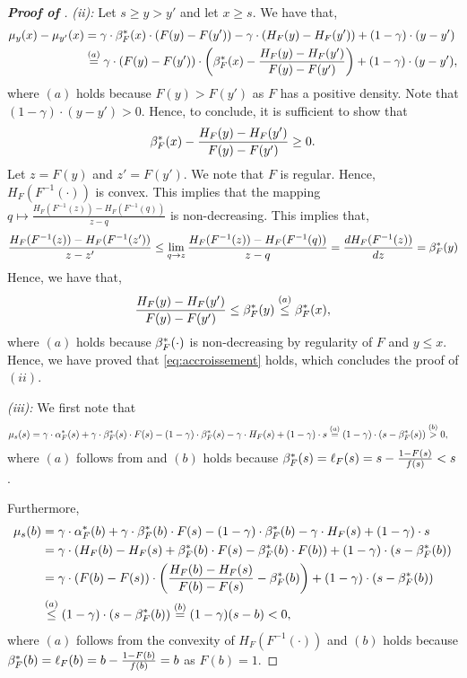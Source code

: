\begin{proof}[\textbf{Proof of }]
\noindent\textit{(ii):} Let $s \geq y > y'$ and let $x \geq s$. We have that,
\begin{align*}
\mu_{y}(x) - \mu_{y'}(x) &= \gamma \cdot \bF \cdot (F(y) - F(y')) - \gamma \cdot ( H_{F}(y) - H_{F}(y')) + (1-\gamma) \cdot (y-y')\\
&\stackrel{(a)}{=}  \gamma \cdot (F(y) - F(y')) \cdot \left( \bF - \frac{H_{F}(y) - H_{F}(y')}{F(y) - F(y')}  \right) + (1-\gamma) \cdot (y-y'),
\end{align*}
where $(a)$ holds because $F(y) > F(y')$ as $F$ has a positive density. Note that $(1-\gamma) \cdot (y-y') > 0$. Hence, to conclude, it is sufficient to show that
\begin{equation}
\label{eq:accroissement}
\bF - \frac{H_{F}(y) - H_{F}(y')}{F(y) - F(y')} \geq 0.
\end{equation}
Let $z = F(y)$ and $z' = F(y')$.
We note that $F$ is regular. Hence, $H_{F}(F^{-1}(\cdot))$ is convex. This implies that the mapping
$q \mapsto \frac{H_{F}(F^{-1}(z)) - H_{F}(F^{-1}(q))}{z-q}$
is non-decreasing. This implies that, 
\begin{equation*}
\frac{H_{F}(F^{-1}(z)) - H_{F}(F^{-1}(z'))}{z-z'} \leq \lim_{q \to z} \frac{H_{F}(F^{-1}(z)) - H_{F}(F^{-1}(q))}{z-q} = \frac{dH_{F}(F^{-1}(z))}{dz} = \bF[y]
\end{equation*}
Hence, we have that,
\begin{equation*}
\frac{H_{F}(y) - H_{F}(y')}{F(y) - F(y')}  \leq \bF[y] \stackrel{(a)}{\leq} \bF,
\end{equation*}
where $(a)$ holds because $\bF[\cdot]$ is non-decreasing by regularity of $F$ and $y \leq x$. Hence, we have proved that \eqref{eq:accroissement} holds, which concludes the proof of $(ii)$.

\noindent\textit{(iii):}
We first note that
\begin{align*}
    \mu_s(s) &= \gamma \cdot \aF[s] + \gamma \cdot \bF[s] \cdot F(s) - (1-\gamma) \cdot \bF[s] - \gamma \cdot H_{F}(s) + (1-\gamma) \cdot s \stackrel{(a)}{=} (1-\gamma) \cdot (s- \bF[s]) \stackrel{(b)}{>} 0, 
\end{align*}
where  $(a)$ follows from  and $(b)$ holds because $\bF[s] = \ell_F(s) =  s - \frac{1-F(s)}{f(s)} < s$.

Furthermore,
\begin{align*}
    \mu_s(b) &= \gamma \cdot \aF[b] + \gamma \cdot \bF[b] \cdot F(s) - (1-\gamma) \cdot \bF[b] - \gamma \cdot H_{F}(s) + (1-\gamma) \cdot s\\
    &= \gamma \cdot \left( H_{F}(b) -  H_{F}(s) + \bF[b] \cdot F(s) - \bF[b] \cdot F(b) \right) + (1-\gamma) \cdot (s - \bF[b]) \\
    &= \gamma \cdot (F(b) - F(s)) \cdot \left( \frac{H_{F}(b) -  H_{F}(s)}{F(b)-F(s)} - \bF[b]  \right) + (1-\gamma) \cdot (s - \bF[b])\\
    &\stackrel{(a)}{\leq} (1-\gamma) \cdot (s - \bF[b]) \stackrel{(b)}{=} (1-\gamma) (s - b) < 0,
\end{align*}
where $(a)$ follows from the convexity of $H_F(F^{-1}(\cdot))$  and $(b)$ holds because $\bF[b] = \ell_F(b) =  b - \frac{1-F(b)}{f(b)} = b$ as $F(b) = 1$.


\end{proof}
